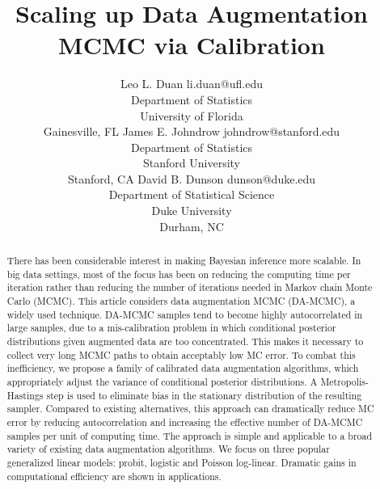 \documentclass[twoside,11pt]{article}
\newcommand{\1}{\mathbf 1}
\begin{document}
%
%
\title{{Scaling up Data Augmentation MCMC via Calibration}}
%
 \def\spacingset#1{\renewcommand{\baselinestretch}%
 {#1}\small\normalsize} \spacingset{1}
%
%
\author{\name Leo L. Duan
            \email li.duan@ufl.edu \\
            \addr Department of Statistics\\ University of Florida \\ Gainesville, FL
            \AND
            \name James E. Johndrow
            \email johndrow@stanford.edu\\
            \addr Department of Statistics \\ Stanford University \\ Stanford, CA
            \AND
            \name David B. Dunson
            \email dunson@duke.edu\\
            \addr Department of Statistical Science \\Duke University\\ Durham, NC
     }
%
\maketitle


\begin{abstract}%
    {There has been considerable interest in making Bayesian inference more scalable.}
{In big data settings}, most of the focus has been on reducing the computing
time per iteration rather than reducing the number of iterations
needed in Markov chain Monte Carlo (MCMC). This article considers data
augmentation MCMC (DA-MCMC), a widely used technique. {DA-MCMC samples tend
to become highly autocorrelated in large samples, due to a mis-calibration problem in which conditional posterior distributions given augmented data are too concentrated.  This makes it necessary to collect very long MCMC
paths to obtain acceptably low MC error.} {To combat this inefficiency, we propose a family of calibrated data augmentation algorithms, which appropriately adjust the variance of conditional posterior distributions. A Metropolis-Hastings step is used to eliminate bias in the stationary distribution of the resulting sampler}. {Compared to existing alternatives, this approach} {can dramatically reduce MC error by reducing autocorrelation and increasing the effective number of DA-MCMC samples per unit of computing time.} The approach is {simple and} applicable to a broad variety of existing data augmentation algorithms. We focus on three popular generalized linear models: probit, logistic and Poisson log-linear. Dramatic gains in computational efficiency are shown in applications.
\end{abstract}
\end{document}
